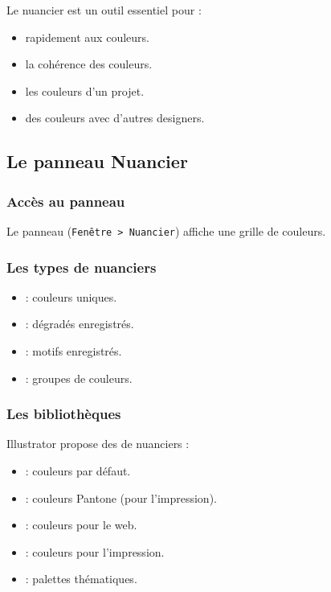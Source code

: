 Le nuancier est un outil essentiel pour :

\begin{itemize}
    \item {} rapidement aux couleurs.
    \item {} la cohérence des couleurs.
    \item {} les couleurs d'un projet.
    \item {} des couleurs avec d'autres designers.
\end{itemize}

\subsection{Le panneau Nuancier}

\subsubsection{Accès au panneau}

Le panneau  (\texttt{Fenêtre > Nuancier}) affiche une grille de couleurs.

\subsubsection{Les types de nuanciers}

\begin{itemize}
    \item {} : couleurs uniques.
    \item {} : dégradés enregistrés.
    \item {} : motifs enregistrés.
    \item {} : groupes de couleurs.
\end{itemize}

\subsubsection{Les bibliothèques}

Illustrator propose des  de nuanciers :

\begin{itemize}
    \item {} : couleurs par défaut.
    \item {} : couleurs Pantone (pour l'impression).
    \item {} : couleurs pour le web.
    \item {} : couleurs pour l'impression.
    \item {} : palettes thématiques.
\end{itemize}

